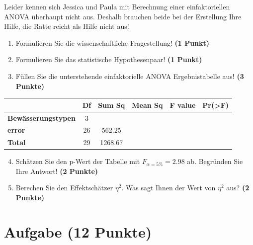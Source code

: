 \documentclass[a4paper, 9pt]{scrartcl}\usepackage[]{graphicx}\usepackage[]{xcolor}
\begin{document}
\vspace{1ex}

Leider kennen sich Jessica und Paula mit Berechnung einer einfaktoriellen ANOVA überhaupt nicht aus. Deshalb brauchen beide bei der Erstellung Ihre Hilfe, die Ratte reicht als Hilfe nicht aus! 

\begin{enumerate}
  \item Formulieren Sie die wissenschaftliche Fragestellung! \textbf{(1 Punkt)}
  \item Formulieren Sie das statistische Hypothesenpaar! \textbf{(1 Punkt)}
\item Füllen Sie die unterstehende einfaktorielle ANOVA Ergebnistabelle aus! \textbf{(3 Punkte)}
\end{enumerate}

\vspace{1Ex}

\begin{center}
  \Large
  \begin{tabular}{lccccp{3cm}}
\toprule
     & \textbf{Df} & \textbf{Sum Sq} & \textbf{Mean Sq} & \textbf{F value} & \textbf{Pr(>F)} \strut\\
    \midrule
   \textbf{Bewässerungstypen}  & 3 &  &  &  &  \strut\\
   \textbf{error}  & 26 & 562.25 &  &  &  \strut\\
   \textbf{Total}  & 29 & 1268.67 &  &  &  \strut\\
\bottomrule
  \end{tabular}
\end{center}

\vspace{1Ex}

\begin{enumerate}
  \setcounter{enumi}{3}
\item Schätzen Sie den p-Wert der Tabelle mit $F_{\alpha = 5\%} = 2.98$ ab. Begründen Sie Ihre Antwort! \textbf{(2 Punkte)}
\item Berechen Sie den Effektschätzer $\eta^2$. Was sagt Ihnen der Wert von $\eta^2$ aus? \textbf{(2 Punkte)}
\end{enumerate}



 
\clearpage

\section{Aufgabe \hfill (12 Punkte)}
\end{document}
